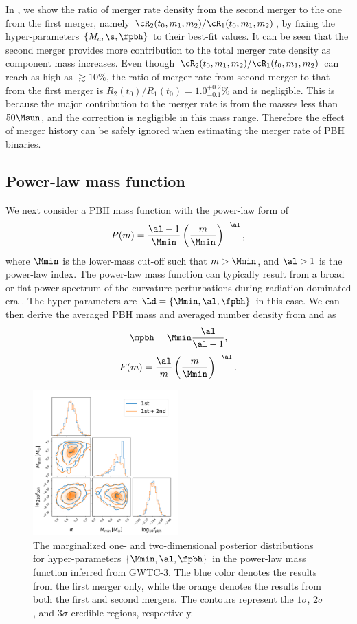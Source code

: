 \documentclass[
reprint,           %
superscriptaddress,%
amsmath,           %
amssymb,           %
aps,               %
prd,               %
notitlepage,       %
longbibliography,  %
floatfix,          %
nofootinbib,
]{revtex4-1}
\def\({\left(}
\def\){\right)}
\def\e{\begin{equation}}
\def\q{\end{equation}}
\begin{document}
In , we show the ratio of merger rate density from the second merger to the one from the first merger, namely $\cR_2(t_0, m_1, m_2)/\cR_1(t_0, m_1, m_2)$, by fixing the hyper-parameters $\{M_c, \s, \fpbh\}$ to their best-fit values. It can be seen that the second merger provides more contribution to the total merger rate density as component mass increases. Even though $\cR_2(t_0, m_1, m_2)/\cR_1(t_0, m_1, m_2)$ can reach as high as $\gtrsim 10\%$, the ratio of merger rate from second merger to that from the first merger is $R_2(t_0)/R_1(t_0) = 1.0^{+0.2}_{-0.1}\%$ and is negligible. This is because the major contribution to the merger rate is from the masses less than $50\Msun$, and the correction is negligible in this mass range. Therefore the effect of merger history can be safely ignored when estimating the merger rate of PBH binaries.

\subsection{Power-law mass function}


We next consider a PBH mass function with the power-law form of \cite{Carr:1975qj}
\e\label{power} 
P(m) = \frac{\al-1}{\Mmin} \(\frac{m}{\Mmin}\)^{-\al},
\q
where $\Mmin$ is the lower-mass cut-off such that $m>\Mmin$, and $\al>1$ is the power-law index. 
The power-law mass function can typically result from a broad or flat power spectrum of the curvature perturbations \cite{DeLuca:2020ioi} during radiation-dominated era \cite{Carr:2016drx,Carr:2017jsz}.
The hyper-parameters are $\Ld = \{\Mmin, \al, \fpbh\}$ in this case. 
We can then derive the averaged PBH mass and averaged number density from  and  as
\e
\mpbh = \Mmin \frac{\al}{\al-1},
\q
\e 
F(m) = \frac{\al}{m} \(\frac{m}{\Mmin}\)^{-\al}.
\q

\begin{figure}[tbp!]
	\centering
	\includegraphics[width=0.5\textwidth]{post-power.pdf}
	\caption{\label{posterior-power}The marginalized one- and two-dimensional posterior distributions for hyper-parameters $\{\Mmin, \al, \fpbh\}$ in the power-law mass function inferred from GWTC-3. The blue color denotes the results from the first merger only, while the orange denotes the results from both the first and second mergers. The contours represent the $1\sigma$, $2\sigma$, and $3\sigma$ credible regions, respectively.}
\end{figure}
\end{document}
